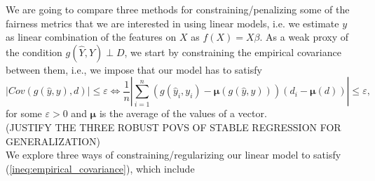 \documentclass[11pt]{article}
\theoremstyle{plain}
\theoremstyle{definition}
\newcommand{\1}{\mathbf{1}}
\begin{document}
We are going to compare three methods for constraining/penalizing some of the fairness metrics that we are interested in using linear models, i.e. we estimate $y$ as linear combination of the features on $X$ as $f(X)=X\beta$. As a weak proxy of the condition $g(\hat{Y}, Y) \perp D$, we start by constraining the empirical covariance between them, i.e., we impose that our model has to satisfy \begin{equation}
\label{ineq:empirical_covariance}
|Cov(g(\hat{y}, y), d)| \leq \varepsilon \iff \frac{1}{n}\left |\sum_{i=1}^n (g(\hat{y}_i, y_i) - {\boldsymbol\mu}(g(\hat{y}, y)) )(d_i - {\boldsymbol\mu}(d))\right| \leq \varepsilon,    
\end{equation}
for some $\varepsilon > 0$ and ${\boldsymbol\mu}$ is the average of the values of a vector.\\ 
{\color{red} (JUSTIFY THE THREE ROBUST POVS OF STABLE REGRESSION FOR GENERALIZATION)}\\
We explore three ways of constraining/regularizing our linear model to satisfy (\ref{ineq:empirical_covariance}), which include
\end{document}
